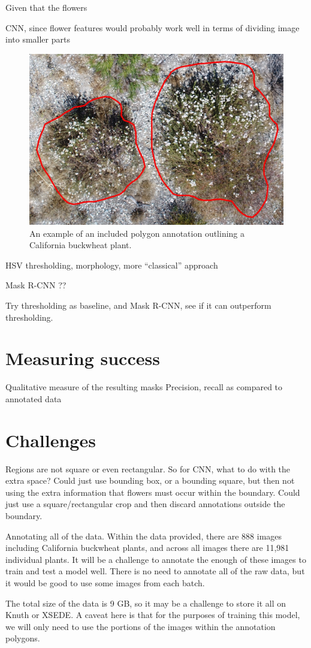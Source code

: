 \documentclass[10pt,twocolumn,letterpaper]{article}
\begin{document}
Given that the flowers

CNN, since flower features would probably work well in terms of dividing image into smaller parts

\begin{figure}[t]
  \centering
   \includegraphics[width=0.9\linewidth]{annotation.jpg}
   \caption{An example of an included polygon annotation outlining a California buckwheat plant.}
   \label{fig:annotation}
\end{figure}

HSV thresholding, morphology, more ``classical'' approach

Mask R-CNN ??

Try thresholding as baseline, and Mask R-CNN, see if it can outperform thresholding.

\section{Measuring success}

Qualitative measure of the resulting masks
Precision, recall as compared to annotated data

\section{Challenges}

Regions are not square or even rectangular. So for CNN, what to do with the extra space? Could just use bounding box, or a bounding square, but then not using the extra information that flowers must occur within the boundary. Could just use a square/rectangular crop and then discard annotations outside the boundary.

Annotating all of the data. Within the data provided, there are 888 images including California buckwheat plants, and across all images there are 11,981 individual plants. It will be a challenge to annotate the enough of these images to train and test a model well. There is no need to annotate all of the raw data, but it would be good to use some images from each batch.

The total size of the data is 9 GB, so it may be a challenge to store it all on Knuth or XSEDE. A caveat here is that for the purposes of training this model, we will only need to use the portions of the images within the annotation polygons.

{\small


}
\end{document}
